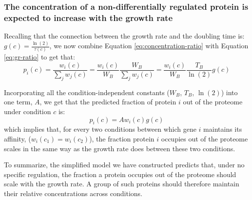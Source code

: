 \subsubsection{The concentration of a non-differentially regulated protein is expected to increase with the growth rate} 
Recalling that the connection between the growth rate and the doubling time is: $g(c)=\frac{\ln(2)}{\tau(c)}$, we now combine Equation \ref{eq:concentration-ratio} with Equation \ref{eq:gr-ratio} to get that:
\begin{equation}
  \label{eq:default-response}
  p_i(c)=\frac{w_i(c)}{\sum_jw_j(c)}=\frac{w_i(c)}{W_B}\frac{W_B}{\sum_jw_j(c)}=\frac{w_i(c)}{W_B}\frac{T_B}{\ln(2)}g(c)
\end{equation}

Incorporating all the condition-independent constants ($W_B$, $T_B$, $\ln(2)$) into one term, $A$, we get that the predicted fraction of protein $i$ out of the proteome under condition $c$ is:
\begin{equation}
  \label{eq:final-conc}
  p_i(c)=Aw_i(c)g(c)
\end{equation}
which implies that, for every two conditions between which gene $i$ maintains its affinity, ($w_i(c_1)=w_i(c_2)$), the fraction protein $i$ occupies out of the proteome scales in the same way as the growth rate does between these two conditions.

To summarize, the simplified model we have constructed predicts that, under no specific regulation, the fraction a protein occupies out of the proteome should scale with the growth rate.
A group of such proteins should therefore maintain their relative concentrations across conditions.